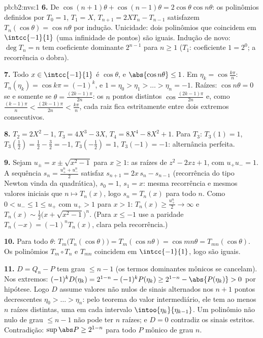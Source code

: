 \begin{solution}{pb:b2:nvs:1}
\textbf{6.} De $\cos(n{+}1)\theta + \cos(n{-}1)\theta =
2\cos\theta\cos n\theta$: os polinômios definidos por $T_0 = 1$,
$T_1 = X$, $T_{n+1} = 2XT_n - T_{n-1}$ satisfazem $T_n(\cos\theta)
= \cos n\theta$ por indução. Unicidade: dois polinômios que
coincidem em $\intcc{-1}{1}$ (uma infinidade de pontos) são iguais.
Indução de novo: $\deg T_n = n$ tem coeficiente dominante
$2^{n-1}$ para $n \geq 1$ ($T_1$: coeficiente $1 = 2^0$; a
recorrência o dobra).

\textbf{7.} Todo $x \in \intcc{-1}{1}$ é $\cos\theta$, e
$\abs{\cos n\theta} \leq 1$. Em $\eta_k = \cos\frac{k\pi}n$:
$T_n(\eta_k) = \cos k\pi = (-1)^k$, e $1 = \eta_0 > \eta_1 >
\dots > \eta_n = -1$. Raízes: $\cos n\theta = 0$ se e somente se $\theta =
\frac{(2k-1)\pi}{2n}$: os $n$ pontos distintos
$\cos\frac{(2k-1)\pi}{2n}$ e, como $\frac{(k-1)\pi}n <
\frac{(2k-1)\pi}{2n} < \frac{k\pi}n$, cada raiz fica estritamente
entre dois extremos consecutivos.

\textbf{8.} $T_2 = 2X^2 - 1$, $T_3 = 4X^3 - 3X$, $T_4 = 8X^4 -
8X^2 + 1$. Para $T_3$: $T_3(1) = 1$, $T_3(\tfrac12) = \tfrac12 -
\tfrac32 = -1$, $T_3(-\tfrac12) = 1$, $T_3(-1) = -1$: alternância
perfeita.

\textbf{9.} Sejam $u_\pm = x \pm \sqrt{x^2 - 1}$ para $x \geq 1$:
as raízes de $z^2 - 2xz + 1$, com $u_+u_- = 1$. A sequência
$s_n = \frac{u_+^n + u_-^n}2$ satisfaz $s_{n+1} = 2x\,s_n -
s_{n-1}$ (recorrência do tipo Newton vinda da quadrática), $s_0 = 1$,
$s_1 = x$: mesma recorrência e mesmos valores iniciais que $n \mapsto
T_n(x)$, logo $s_n = T_n(x)$ para todo $n$. Como $0 < u_- \leq 1
\leq u_+$ com $u_+ > 1$ para $x > 1$: $T_n(x) \geq
\frac{u_+^n}2 \to \infty$ e $T_n(x) \sim \frac12\bigl(x +
\sqrt{x^2-1}\bigr)^n$. (Para $x \leq -1$ use a paridade $T_n(-x)
= (-1)^nT_n(x)$, clara pela recorrência.)

\textbf{10.} Para todo $\theta$: $T_m\bigl(T_n(\cos\theta)\bigr)
= T_m(\cos n\theta) = \cos mn\theta =
T_{mn}(\cos\theta)$. Os polinômios $T_m \circ T_n$ e
$T_{mn}$ coincidem em $\intcc{-1}{1}$, logo são iguais.

\textbf{11.} $D = Q_n - P$ tem grau $\leq n - 1$ (os termos dominantes
mônicos se cancelam). Nos extremos: $(-1)^kD(\eta_k) =
2^{1-n} - (-1)^kP(\eta_k) \geq 2^{1-n} - \abs{P(\eta_k)} > 0$ por
hipótese. Logo $D$ assume valores não nulos de sinais alternados nos
$n + 1$ pontos decrescentes $\eta_0 > \dots > \eta_n$: pelo
teorema do valor intermediário, ele tem ao menos $n$ raízes distintas,
uma em cada intervalo  $\intoo{\eta_{k}}{\eta_{k-1}}$. Um
polinômio não nulo de grau $\leq n - 1$ não pode ter $n$ raízes;
e $D = 0$ contradiz os sinais estritos. Contradição:
$\sup\abs P \geq 2^{1-n}$ para todo $P$ mônico de grau $n$.


\end{solution}
